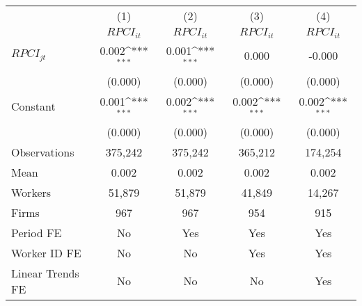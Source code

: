 {
\def\sym#1{\ifmmode^{#1}\else\(^{#1}\)\fi}
\begin{tabular}{l*{4}{c}}
\hline\hline
                    &\multicolumn{1}{c}{(1)}&\multicolumn{1}{c}{(2)}&\multicolumn{1}{c}{(3)}&\multicolumn{1}{c}{(4)}\\
                    &\multicolumn{1}{c}{$RPCI_{it}$}&\multicolumn{1}{c}{$RPCI_{it}$}&\multicolumn{1}{c}{$RPCI_{it}$}&\multicolumn{1}{c}{$RPCI_{it}$}\\
\hline
$RPCI_{jt}$         &       0.002\sym{***}&       0.001\sym{***}&       0.000         &      -0.000         \\
                    &     (0.000)         &     (0.000)         &     (0.000)         &     (0.000)         \\
[1em]
Constant            &       0.001\sym{***}&       0.002\sym{***}&       0.002\sym{***}&       0.002\sym{***}\\
                    &     (0.000)         &     (0.000)         &     (0.000)         &     (0.000)         \\
\hline
Observations        &     375,242         &     375,242         &     365,212         &     174,254         \\
Mean                &       0.002         &       0.002         &       0.002         &       0.002         \\
Workers             &      51,879         &      51,879         &      41,849         &      14,267         \\
Firms               &         967         &         967         &         954         &         915         \\
Period FE           &          No         &         Yes         &         Yes         &         Yes         \\
Worker ID FE        &          No         &          No         &         Yes         &         Yes         \\
Linear Trends FE    &          No         &          No         &          No         &         Yes         \\
\hline\hline
\end{tabular}
}
